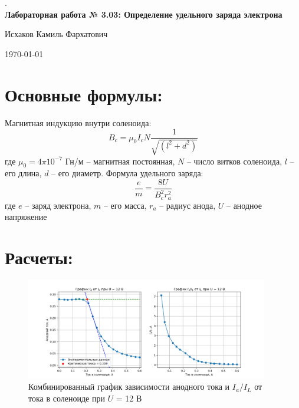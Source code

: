 \documentclass{article}%
\begin{document}
%
\normalsize%
\begin{center}%
.\\%
\vspace{12cm}%
\textbf{Лабораторная работа № 3.03: Определение удельного заряда электрона}%
\end{center}%
\begin{center}%
Исхаков Камиль Фархатович%
\end{center}%
\begin{center}%
\today%
\end{center}%
\newpage%
\section{Основные формулы:}%
\label{sec:}%

%
Магнитная индукцию внутри соленоида:\begin{displaymath} B_c = \mu_0 I_c N \frac{1}{\sqrt{(l^2+d^2)}}\end{displaymath}%
\newline%
где $\mu_0 =  4 \pi 10^{-7} $ Гн/м – магнитная постоянная, $N$ – число витков соленоида, $l$ – его длина, $d$ – его диаметр.%
\newline%
Формула удельного заряда:\begin{displaymath}\frac{e}{m} = \frac{8 U}{B_c^2 r_a^2}\end{displaymath}%
\newline%
где $e$ – заряд электрона, $m$ – его масса, $r_a$ – радиус анода, $U$ – анодное напряжение%
\newline%
\section{Расчеты:}%
\label{sec:}%

%


\begin{figure}[h!]%
\centering%
\includegraphics[width=400px]{combined_plot_U_12.png}%
\caption{Комбинированный график зависимости анодного тока и $I_a/I_L$ от тока в соленоиде при $U$ = 12 В}%
\end{figure}
\end{document}
